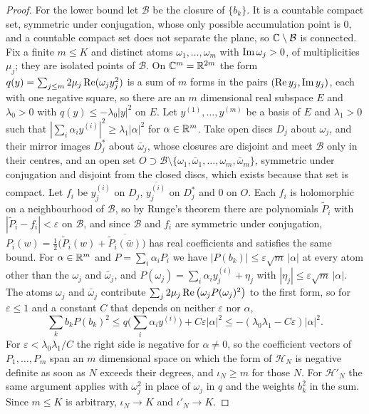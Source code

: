 \begin{proof}
For the lower bound let $\mathcal B$ be the closure of $\{b_k\}$. It is a countable compact set, symmetric under conjugation, whose only possible accumulation point is $0$, and a countable compact set does not separate the plane, so $\mathbb{C}\setminus\mathcal B$ is connected. Fix a finite $m\le K$ and distinct atoms $\omega_1,\dots,\omega_m$ with $\operatorname{Im}\omega_j>0$, of multiplicities $\mu_j$; they are isolated points of $\mathcal B$. On $\mathbb{C}^m=\mathbb{R}^{2m}$ the form $q(y)=\sum_{j\le m}2\mu_j\operatorname{Re}(\omega_jy_j^2)$ is a sum of $m$ forms in the pairs $(\operatorname{Re} y_j,\operatorname{Im} y_j)$, each with one negative square, so there are an $m$ dimensional real subspace $E$ and $\lambda_0>0$ with $q(y)\le-\lambda_0|y|^2$ on $E$. Let $y^{(1)},\dots,y^{(m)}$ be a basis of $E$ and $\lambda_1>0$ such that $|\sum_i\alpha_iy^{(i)}|^2\ge\lambda_1|\alpha|^2$ for $\alpha\in\mathbb{R}^m$. Take open discs $D_j$ about $\omega_j$, and their mirror images $D_j^*$ about $\bar\omega_j$, whose closures are disjoint and meet $\mathcal B$ only in their centres, and an open set $O\supset\mathcal B\setminus\{\omega_1,\bar\omega_1,\dots,\omega_m,\bar\omega_m\}$, symmetric under conjugation and disjoint from the closed discs, which exists because that set is compact. Let $f_i$ be $y^{(i)}_j$ on $D_j$, $\overline{y^{(i)}_j}$ on $D_j^*$ and $0$ on $O$. Each $f_i$ is holomorphic on a neighbourhood of $\mathcal B$, so by Runge's theorem there are polynomials $\tilde P_i$ with $|\tilde P_i-f_i|<\varepsilon$ on $\mathcal B$, and since $\mathcal B$ and $f_i$ are symmetric under conjugation, $P_i(w)=\frac12\big(\tilde P_i(w)+\overline{\tilde P_i(\bar w)}\big)$ has real coefficients and satisfies the same bound. For $\alpha\in\mathbb{R}^m$ and $P=\sum_i\alpha_iP_i$ we have $|P(b_k)|\le\varepsilon\sqrt m\,|\alpha|$ at every atom other than the $\omega_j$ and $\bar\omega_j$, and $P(\omega_j)=\sum_i\alpha_iy^{(i)}_j+\eta_j$ with $|\eta_j|\le\varepsilon\sqrt m\,|\alpha|$. The atoms $\omega_j$ and $\bar\omega_j$ contribute $\sum_j2\mu_j\operatorname{Re}\big(\omega_jP(\omega_j)^2\big)$ to the first form, so for $\varepsilon\le1$ and a constant $C$ that depends on neither $\varepsilon$ nor $\alpha$,
\[
\sum_kb_kP(b_k)^2\le q\Big(\sum_i\alpha_iy^{(i)}\Big)+C\varepsilon|\alpha|^2\le-(\lambda_0\lambda_1-C\varepsilon)|\alpha|^2 .
\]
For $\varepsilon<\lambda_0\lambda_1/C$ the right side is negative for $\alpha\ne0$, so the coefficient vectors of $P_1,\dots,P_m$ span an $m$ dimensional space on which the form of $\mathcal H_N$ is negative definite as soon as $N$ exceeds their degrees, and $\iota_N\ge m$ for those $N$. For $\mathcal H'_N$ the same argument applies with $\omega_j^2$ in place of $\omega_j$ in $q$ and the weights $b_k^2$ in the sum. Since $m\le K$ is arbitrary, $\iota_N\to K$ and $\iota'_N\to K$.
\end{proof}

